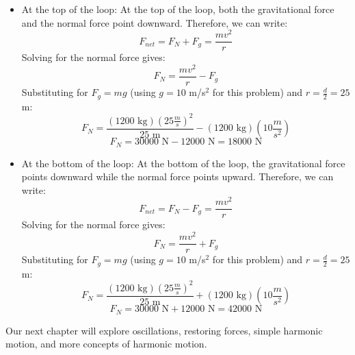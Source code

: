 \begin{Answer}[ref=rollercoaster]
  \begin{itemize}
    \item At the top of the loop:
          At the top of the loop, both the gravitational force and the normal force point downward. Therefore, we can write:
          $$F_{net} = F_N + F_g = \frac{mv^2}{r}$$
          Solving for the normal force gives:
          $$F_N = \frac{mv^2}{r} - F_g$$
          Substituting for $F_g = mg$ (using $g = 10$ m/s$^2$ for this problem) and $r = \frac{d}{2} = 25$ m:
          $$F_N = \frac{(1200 \text{ kg})(25 \frac{m}{s})^2}{25 \text{ m}} - (1200 \text{ kg})(10 \frac{m}{s^2})$$
          $$F_N = 30000 \text{ N} - 12000 \text{ N} = 18000 \text{ N}$$

    \item At the bottom of the loop:
          At the bottom of the loop, the gravitational force points downward while the normal force points upward. Therefore, we can write:
          $$F_{net} = F_N - F_g = \frac{mv^2}{r}$$
          Solving for the normal force gives:
          $$F_N = \frac{mv^2}{r} + F_g$$
          Substituting for $F_g = mg$ (using $g = 10$ m/s$^2$ for this problem) and $r = \frac{d}{2} = 25$ m:
          $$F_N = \frac{(1200 \text{ kg})(25 \frac{m}{s})^2}{25 \text{ m}} + (1200 \text{ kg})(10 \frac{m}{s^2})$$
          $$F_N = 30000 \text{ N} + 12000 \text{ N} = 42000 \text{ N}$$
  \end{itemize}
\end{Answer}
Our next chapter will explore oscillations, restoring forces, simple harmonic motion, and more concepts of harmonic motion.
